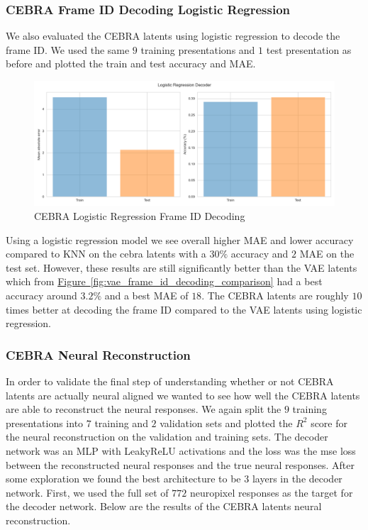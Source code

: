 \documentclass[12pt, letterpaper]{article}
\begin{document}
\subsubsection{CEBRA Frame ID Decoding Logistic Regression}
\label{subsubsec:cebra_frame_id_decoding_logistic}
We also evaluated the CEBRA latents using logistic regression to decode the frame ID. We used the same $9$ training presentations and $1$ test presentation as before and plotted the train and test accuracy and MAE.

\begin{figure}[H]
    \centering
    \includegraphics[width=.8\textwidth]{cebra_latents_lr_decoder.png}
    \caption{CEBRA Logistic Regression Frame ID Decoding}
    \label{fig:cebra_logistic_frame_id_accuracy_mae}
\end{figure}

Using a logistic regression model we see overall higher MAE and lower accuracy compared to KNN on the cebra latents with a $30\%$ accuracy and $2$ MAE on the test set. However, these results are still significantly better than the VAE latents which from \hyperref[fig:vae_frame_id_decoding_comparison]{Figure~\ref{fig:vae_frame_id_decoding_comparison}} had a best accuracy around $3.2\%$ and a best MAE of $18$. The CEBRA latents are roughly $10$ times better at decoding the frame ID compared to the VAE latents using logistic regression.

\subsubsection{CEBRA Neural Reconstruction}
\label{subsubsec:cebra_neural_reconstruction}
In order to validate the final step of understanding whether or not CEBRA latents are actually neural aligned we wanted to see how well the CEBRA latents are able to reconstruct the neural responses. We again split the $9$ training presentations into $7$ training and $2$ validation sets and plotted the $R^2$ score for the neural reconstruction on the validation and training sets. The decoder network was an MLP with LeakyReLU activations and the loss was the mse loss between the reconstructed neural responses and the true neural responses. After some exploration we found the best architecture to be $3$ layers in the decoder network. First, we used the full set of $772$ neuropixel responses as the target for the decoder network. Below are the results of the CEBRA latents neural reconstruction.
\end{document}
